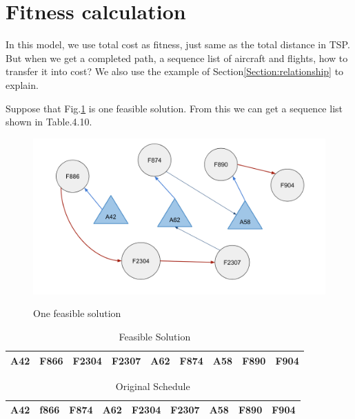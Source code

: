 \documentclass[senior]{IPSstyle}
\begin{document}
\section{Fitness calculation}\label{Fitness calculation}

 In this model, we use total cost as fitness, just same as the total distance in TSP. But when we get a completed path, a sequence list of aircraft and flights, how to transfer it into cost? We also use the example of Section\ref{Section:relationship} to explain.

Suppose that Fig.\ref{fig:one feasible solution} is one feasible solution. From this we can get a sequence list shown in Table.4.10.

\begin{figure}[h]
    \centering
    \includegraphics[width=15cm]{MasterThesis-master/feasible-solution1.png}\\
    \caption{One feasible solution}
    \label{fig:one feasible solution}
\end{figure}

\begin{table}[h]
\centering
\label{table: feasible solution}
\begin{tabular}{|c|c|c|c|c|c|c|c|c|}
\hline
A42 & F866 & F2304 & F2307 & A62 & F874 & A58 & F890 & F904 \\ \hline
\end{tabular}
\caption{Feasible Solution}
\end{table}

\begin{table}
\centering
\begin{tabular}{|l|l|l|l|l|l|l|l|l|} 
\hline
A42 & f866 & F874 & A62 & F2304 & F2307 & A58 & F890 & F904  \\
\hline
\end{tabular}
\caption{Original Schedule}
\label{table: Original schedule}
\end{table}
\end{document}
